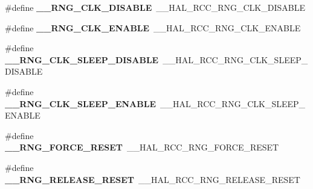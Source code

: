 \begin{DoxyCompactItemize}
\item 
\hypertarget{group___h_a_l___r_c_c___aliased_gacd4f0db00b9c80187765853cc9ff04a2}{\#define {\bfseries \-\_\-\-\_\-\-R\-N\-G\-\_\-\-C\-L\-K\-\_\-\-D\-I\-S\-A\-B\-L\-E}~\-\_\-\-\_\-\-H\-A\-L\-\_\-\-R\-C\-C\-\_\-\-R\-N\-G\-\_\-\-C\-L\-K\-\_\-\-D\-I\-S\-A\-B\-L\-E}\label{group___h_a_l___r_c_c___aliased_gacd4f0db00b9c80187765853cc9ff04a2}

\item 
\hypertarget{group___h_a_l___r_c_c___aliased_ga766db26e2cb32163c41af63ea098d17b}{\#define {\bfseries \-\_\-\-\_\-\-R\-N\-G\-\_\-\-C\-L\-K\-\_\-\-E\-N\-A\-B\-L\-E}~\-\_\-\-\_\-\-H\-A\-L\-\_\-\-R\-C\-C\-\_\-\-R\-N\-G\-\_\-\-C\-L\-K\-\_\-\-E\-N\-A\-B\-L\-E}\label{group___h_a_l___r_c_c___aliased_ga766db26e2cb32163c41af63ea098d17b}

\item 
\hypertarget{group___h_a_l___r_c_c___aliased_gacb8c82d2f6524d61f53f4d744b1ea469}{\#define {\bfseries \-\_\-\-\_\-\-R\-N\-G\-\_\-\-C\-L\-K\-\_\-\-S\-L\-E\-E\-P\-\_\-\-D\-I\-S\-A\-B\-L\-E}~\-\_\-\-\_\-\-H\-A\-L\-\_\-\-R\-C\-C\-\_\-\-R\-N\-G\-\_\-\-C\-L\-K\-\_\-\-S\-L\-E\-E\-P\-\_\-\-D\-I\-S\-A\-B\-L\-E}\label{group___h_a_l___r_c_c___aliased_gacb8c82d2f6524d61f53f4d744b1ea469}

\item 
\hypertarget{group___h_a_l___r_c_c___aliased_ga986bcd5b8c1fcb8798117ab1fa762e28}{\#define {\bfseries \-\_\-\-\_\-\-R\-N\-G\-\_\-\-C\-L\-K\-\_\-\-S\-L\-E\-E\-P\-\_\-\-E\-N\-A\-B\-L\-E}~\-\_\-\-\_\-\-H\-A\-L\-\_\-\-R\-C\-C\-\_\-\-R\-N\-G\-\_\-\-C\-L\-K\-\_\-\-S\-L\-E\-E\-P\-\_\-\-E\-N\-A\-B\-L\-E}\label{group___h_a_l___r_c_c___aliased_ga986bcd5b8c1fcb8798117ab1fa762e28}

\item 
\hypertarget{group___h_a_l___r_c_c___aliased_gae619bcc84a660ded8baf711bfaca4069}{\#define {\bfseries \-\_\-\-\_\-\-R\-N\-G\-\_\-\-F\-O\-R\-C\-E\-\_\-\-R\-E\-S\-E\-T}~\-\_\-\-\_\-\-H\-A\-L\-\_\-\-R\-C\-C\-\_\-\-R\-N\-G\-\_\-\-F\-O\-R\-C\-E\-\_\-\-R\-E\-S\-E\-T}\label{group___h_a_l___r_c_c___aliased_gae619bcc84a660ded8baf711bfaca4069}

\item 
\hypertarget{group___h_a_l___r_c_c___aliased_ga24e421e3737cdb35e854520e14f29266}{\#define {\bfseries \-\_\-\-\_\-\-R\-N\-G\-\_\-\-R\-E\-L\-E\-A\-S\-E\-\_\-\-R\-E\-S\-E\-T}~\-\_\-\-\_\-\-H\-A\-L\-\_\-\-R\-C\-C\-\_\-\-R\-N\-G\-\_\-\-R\-E\-L\-E\-A\-S\-E\-\_\-\-R\-E\-S\-E\-T}\label{group___h_a_l___r_c_c___aliased_ga24e421e3737cdb35e854520e14f29266}


\end{DoxyCompactItemize}
